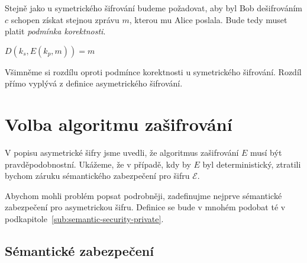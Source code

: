 \documentclass[
  program=infoi,
  biblatex,
  figures=false,
  glossaries,
  index
]{kidiplom}
\begin{document}
    Stejně jako u symetrického šifrování budeme požadovat, aby byl Bob dešifrováním $c$ schopen získat stejnou zprávu $m$, kterou mu Alice poslala.
    Bude tedy muset platit \emph{podmínka korektnosti}.

    \begin{center}
        $D(k_s, E(k_p, m))=m$
    \end{center}


    \begin{remark}
        Všimněme si rozdílu oproti podmínce korektnosti u symetrického šifrování.
        Rozdíl přímo vyplývá z definice asymetrického šifrování.
    \end{remark}


\section{Volba algoritmu zašifrování}

    V popisu asymetrické šifry jsme uvedli, že algoritmus zašifrování $E$ musí být pravděpodobnostní.
    Ukážeme, že v případě, kdy by $E$ byl deterministický, ztratili bychom záruku sémantického zabezpečení pro šifru $\mathcal{E}$.

    Abychom mohli problém popsat podrobněji, zadefinujme nejprve sémantické zabezpečení pro asymetrickou šifru.
    Definice se bude v mnohém podobat té v podkapitole~\ref{sub:semantic-security-private}.

    \subsection{Sémantické zabezpečení}\label{sub:semantic-security-public}
\end{document}

